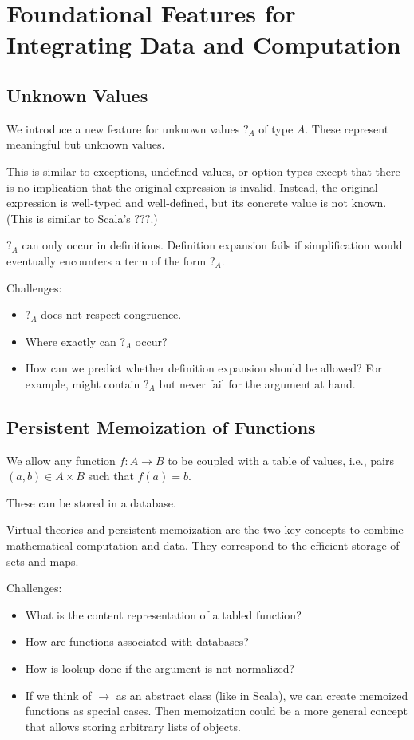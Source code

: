 \section{Foundational Features for Integrating Data and Computation}

\subsection{Unknown Values}

We introduce a new feature for unknown values $?_A$ of type $A$.
These represent meaningful but unknown values.

This is similar to exceptions, undefined values, or option types except that there is no implication that the original expression is invalid.
Instead, the original expression is well-typed and well-defined, but its concrete value is not known.
(This is similar to Scala's $???$.)

$?_A$ can only occur in definitions.
Definition expansion fails if simplification would eventually encounters a term of the form $?_A$.

Challenges:
\begin{itemize}
 \item $?_A$ does not respect congruence.
 \item Where exactly can $?_A$ occur?
 \item How can we predict whether definition expansion should be allowed? For example, might contain $?_A$ but never fail for the argument at hand.
\end{itemize}

\subsection{Persistent Memoization of Functions}

We allow any function $f:A \to B$ to be coupled with a table of values, i.e., pairs $(a,b)\in A\times B$ such that $f(a)=b$.

These can be stored in a database.

Virtual theories and persistent memoization are the two key concepts to combine mathematical computation and data.
They correspond to the efficient storage of sets and maps.

Challenges:
\begin{itemize}
 \item What is the content representation of a tabled function?
 \item How are functions associated with databases?
 \item How is lookup done if the argument is not normalized?
 \item If we think of $\to$ as an abstract class (like in Scala), we can create memoized functions as special cases.
 Then memoization could be a more general concept that allows storing arbitrary lists of objects.
\end{itemize}

